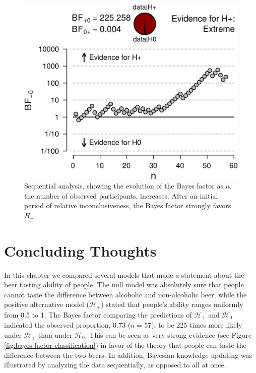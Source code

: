 \documentclass[
]{book}
\begin{document}
\begin{figure}

{\centering \includegraphics[width=1\linewidth]{Figures/BeerSequentialAnalysis} 

}

\caption{Sequential analysis, showing the evolution of the Bayes factor as $n$, the number of observed participants, increases. After an initial period of relative inconclusiveness, the Bayes factor strongly favors $H_+$.}\label{fig:jasp-beer-result-sequential-analysis}
\end{figure}

\hypertarget{concluding-thoughts-2}{%
\section{Concluding Thoughts}\label{concluding-thoughts-2}}

In this chapter we compared several models that made a statement about the beer tasting ability of people. The null model was absolutely sure that people cannot taste the difference between alcoholic and non-alcoholic beer, while the positive alternative model (\(\mathcal{H}_+\)) stated that people's ability ranges uniformly from 0.5 to 1. The Bayes factor comparing the predictions of \(\mathcal{H}_+\) and \(\mathcal{H}_0\) indicated the observed proportion, \(0.73\) (\(n = 57\)), to be 225 times more likely under \(\mathcal{H}_+\) than under \(\mathcal{H}_0\). This can be seen as very strong evidence (see Figure \ref{fig:bayes-factor-classification}) in favor of the theory that people can taste the difference between the two beers. In addition, Bayesian knowledge updating was illustrated by analyzing the data sequentially, as opposed to all at once.
\end{document}

